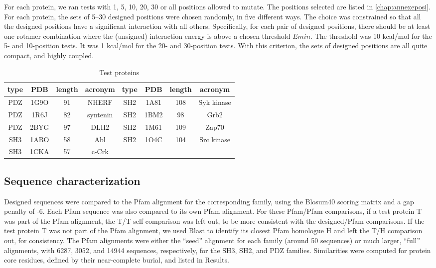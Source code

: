 For each protein, we ran tests with 1, 5, 10, 20, 30 or all positions allowed to mutate. The positions selected are listed in \ref{chap:annexeposi}. For each protein, the sets of 5–30 designed positions were chosen randomly, in five different ways. The choice was constrained so that all the designed positions have a significant interaction with all others.
Specifically, for each pair of designed positions, there should be at least one rotamer combination where the (unsigned) interaction energy is above a chosen threshold $Emin$. The threshold was 10 kcal/mol for the 5- and 10-position tests.
It was 1 kcal/mol for the 20- and 30-position tests. With this criterion, the sets of designed positions are all quite compact, and highly coupled.


\begin{table}[H]                            
\caption{Test proteins}
\label{tab:proteins}                      
\begin{center}
\begin{tabular}{cccccccc} \hline \hline  
type & PDB  & length & acronym  & type & PDB  & length & acronym \\ \hline
PDZ  & 1G9O &  91    & NHERF    & SH2  & 1A81 & 108    & Syk kinase \\ 
PDZ  & 1R6J &  82    & syntenin & SH2  & 1BM2 &  98    & Grb2       \\
PDZ  & 2BYG &  97    & DLH2     & SH2  & 1M61 & 109    & Zap70      \\
SH3  & 1ABO &  58    & Abl      & SH2  & 1O4C & 104    & Src kinase \\
SH3  & 1CKA &  57    & c-Crk    &      &      &        &     \\ \hline
\end{tabular}
\end{center}
\end{table}

\subsection{Sequence characterization}
Designed sequences were compared to the Pfam alignment for the corresponding family, using the Blosum40 scoring matrix and a gap penalty of -6. Each Pfam sequence was also compared to its own Pfam alignment. For these Pfam/Pfam comparisons, if a test protein T was part of the Pfam alignment, the T/T self comparison was left out, to be more consistent with the designed/Pfam comparisons. If the test protein T was not part of the Pfam alignment, we used Blast to identify its closest Pfam homologue H and left the T/H comparison out, for consistency. The Pfam alignments were either the ``seed'' alignment for each family (around 50 sequences) or much larger, ``full'' alignments, with 6287, 3052, and 14944 sequences, respectively, for the SH3, SH2, and PDZ families. Similarities were computed for protein core residues, defined by their near-complete burial, and listed in Results.

